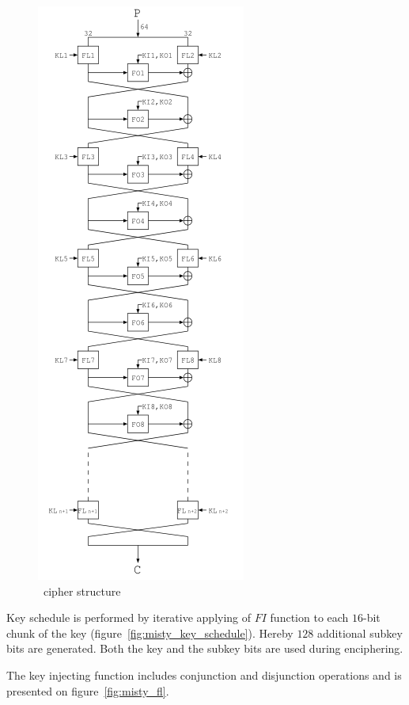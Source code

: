 \begin{figure}[htbp]
	\centering
    \includegraphics[scale=0.7]{images/misty_feistel}
	\caption{\misty\ cipher structure}
    \label{fig:misty_feistel}
\end{figure}

Key schedule is performed by iterative applying of $FI$ function to each 
$16$-bit chunk of the key (figure~\ref{fig:misty_key_schedule}). Hereby $128$
additional subkey bits are generated.  Both the key and the subkey bits are used
during enciphering.

The key injecting function includes conjunction and disjunction operations and 
is presented on figure~\ref{fig:misty_fl}.

